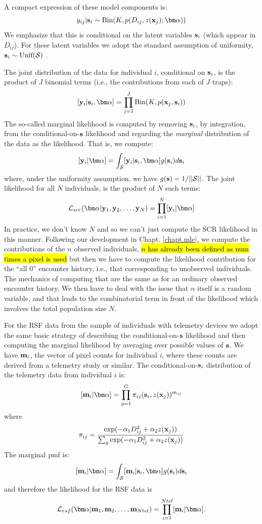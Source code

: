 A compact expression of these model components is:
\begin{equation}
y_{ij}| {\bf s}_{i} \sim \mbox{Bin}(K, p(D_{ij}, z({\bf x}_{j}); {\bm \alpha}))
\label{rsf.mle.eq.cond-on-s}
\end{equation}
We emphasize that this is conditional on the latent variables ${\bf
  s}_{i}$ (which appear in $D_{ij}$). For these latent variables we
adopt the standard assumption of uniformity, ${\bf s}_{i} \sim
\mbox{Unif}({\cal S})$ \citep{royle_young:2008}.


The joint distribution of the data for
individual $i$, conditional on ${\bf s}_{i}$, is the product of $J$
binomial terms (i.e., the contributions from each of $J$ traps):
\[
  [{\bf y}_{i} | {\bf s}_{i} , {\bm \alpha}] =
  \prod_{j=1}^{J} \mbox{Bin}(K, p({\bf x}_{j},{\bf s}_{i}) )
\]
The so-called marginal likelihood \citep{borchers_efford:2008} is
computed by removing ${\bf s}_{i}$, by integration, from the
conditional-on-${\bf s}$ likelihood and regarding the {\it marginal}
distribution of the data as the likelihood. That is, we compute:
\[
  [{\bf y}_{i}|{\bm \alpha}] =
\int_{{\cal S}}  [ {\bf y}_{i} |{\bf s}_{i},{\bm \alpha}] g({\bf s}_{i}) d{\bf s}_{i}
\]
{\flushleft where}, under the uniformity assumption, we have
$g({\bf s}) = 1/||{\cal S}||$.
The joint likelihood for all $N$ individuals,
is the product of $N$ such terms:
\[
{\cal L}_{scr}({\bm \alpha} | {\bf y}_{1},{\bf y}_{2},\ldots, {\bf y}_{N}) = \prod_{i=1}^{N}
[{\bf y}_{i}|{\bm \alpha}]
\]
In practice, we don't know $N$ and so we can't just compute the
SCR likelihood in this manner. Following our development in
Chapt. \ref{chapt.mle},
we compute the contributions of the
$n$ observed individuals,
\hl{$n$ has already been defined as num times a pixel is used}
but then we have to compute the likelihood
contribution for the ``all 0'' encounter history, i.e., that
corresponding to unobserved individuals. The mechanics of computing
that are the same as for an ordinary observed encounter history. We
then have to deal with the issue that $n$ itself is a random variable,
and that leads to the combinatorial term in front of the likelihood
which involves the total population size $N$.

For the RSF data from the sample of individuals with telemetry devices
we adopt the same basic strategy of describing the
conditional-on-${\bf s}$ likelihood and then computing the marginal
likelihood by averaging over possible values of ${\bf s}$.
We have ${\bf m}_{i}$, the vector of pixel counts for individual $i$,
where these counts are derived from a telemetry study or similar.
The conditional-on-${\bf s}_{i}$ distribution of the telemetry data
from individual $i$ is:
\[
 [{\bf m}_{i}  | {\bm \alpha} ]
 = \prod_{g=1}^{G}  \pi_{ij}({\bf s}_{i},z({\bf x}_{j})) ^{m_{ij}}
\]
where
\[
 \pi_{ij}  = \frac{ \exp( -\alpha_{1} D_{ij}^{2} +\alpha_{2} z({\bf x}_{j}) ) }
{ \sum_{g} \exp(-\alpha_{1} D_{ij}^{2} +\alpha_{2} z({\bf x}_{j}))}
\]
The marginal pmf is:
\[
     [{\bf m}_{i}|{\bm \alpha}] =    \int_{{\cal S}}  [ {\bf m}_{i} |{\bf s}_{i},{\bm \alpha}] g({\bf s}_{i}) d{\bf s}_{i}
\]
and therefore the likelihood for the RSF data is
\[
{\cal L}_{rsf}({\bm \alpha} | {\bf m}_{1},{\bf m}_{2},\ldots, {\bf m}_{Ntel}) = \prod_{i=1}^{Ntel}
[{\bf m}_{i}|{\bm \alpha}].
\]


